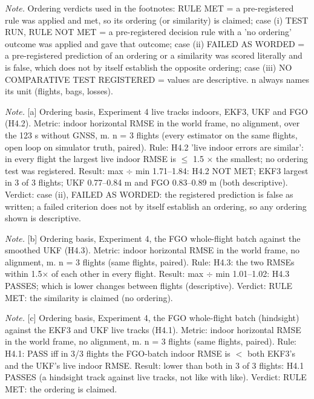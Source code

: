 \begin{table}[htbp]
\textit{Note.} Ordering verdicts used in the footnotes: RULE MET = a pre-registered rule was applied and met, so its ordering (or similarity) is claimed; case (i) TEST RUN, RULE NOT MET = a pre-registered decision rule with a 'no ordering' outcome was applied and gave that outcome; case (ii) FAILED AS WORDED = a pre-registered prediction of an ordering or a similarity was scored literally and is false, which does not by itself establish the opposite ordering; case (iii) NO COMPARATIVE TEST REGISTERED = values are descriptive. n always names its unit (flights, bags, losses).\par
\textit{Note.} [a] Ordering basis, Experiment 4 live tracks indoors, EKF3, UKF and FGO (H4.2). Metric: indoor horizontal RMSE in the world frame, no alignment, over the 123 s without GNSS, m. n = 3 flights (every estimator on the same flights, open loop on simulator truth, paired). Rule: H4.2 'live indoor errors are similar': in every flight the largest live indoor RMSE is $\le$ 1.5 $\times$ the smallest; no ordering test was registered. Result: max $\div$ min 1.71--1.84: H4.2 NOT MET; EKF3 largest in 3 of 3 flights; UKF 0.77--0.84 m and FGO 0.83--0.89 m (both descriptive). Verdict: case (ii), FAILED AS WORDED: the registered prediction is false as written; a failed criterion does not by itself establish an ordering, so any ordering shown is descriptive.\par
\textit{Note.} [b] Ordering basis, Experiment 4, the FGO whole-flight batch against the smoothed UKF (H4.3). Metric: indoor horizontal RMSE in the world frame, no alignment, m. n = 3 flights (same flights, paired). Rule: H4.3: the two RMSEs within 1.5$\times$ of each other in every flight. Result: max $\div$ min 1.01--1.02: H4.3 PASSES; which is lower changes between flights (descriptive). Verdict: RULE MET: the similarity is claimed (no ordering).\par
\textit{Note.} [c] Ordering basis, Experiment 4, the FGO whole-flight batch (hindsight) against the EKF3 and UKF live tracks (H4.1). Metric: indoor horizontal RMSE in the world frame, no alignment, m. n = 3 flights (same flights, paired). Rule: H4.1: PASS iff in 3/3 flights the FGO-batch indoor RMSE is $<$ both EKF3's and the UKF's live indoor RMSE. Result: lower than both in 3 of 3 flights: H4.1 PASSES (a hindsight track against live tracks, not like with like). Verdict: RULE MET: the ordering is claimed.\par
\end{table}
